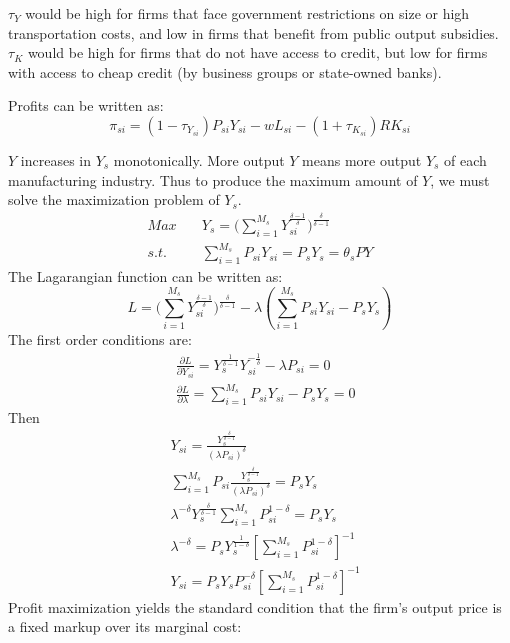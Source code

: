 \documentclass{article}
\begin{document}
$\tau_Y$ would be high for firms that face government restrictions on size or high transportation costs, and low in firms that benefit from public output subsidies. $\tau_K$ would be high for firms that do not have access to credit, but low for firms with access to cheap credit (by business groups or state-owned banks).

Profits can be written as:
\begin{equation*}
    \pi_{si}=(1-\tau_{Y_{si}})P_{si}Y_{si}-wL_{si}-(1+\tau_{K_{si}})RK_{si}
\end{equation*}

$Y$ increases in $Y_s$ monotonically. More output $Y$ means more output $Y_s$ of each manufacturing industry. Thus to produce the maximum amount of $Y$, we must solve the maximization problem of $Y_s$.
\begin{align*}
    Max \quad & Y_s=\biggl(\sum_{i=1}^{M_s}Y_{si}^{\frac{\delta-1}{\delta }}\biggr)^\frac{\delta}{\delta-1}\\
    s.t. \quad & \sum_{i=1}^{M_s} P_{si}Y_{si}=P_sY_s=\theta_sPY
\end{align*}
The Lagarangian function can be written as:
\begin{equation*}
    L=\biggl(\sum_{i=1}^{M_s}Y_{si}^{\frac{\delta-1}{\delta }}\biggr)^\frac{\delta}{\delta-1}-\lambda(\sum_{i=1}^{M_s} P_{si}Y_{si}-P_sY_s)
\end{equation*}
The first order conditions are:
\begin{align*}
    &\frac{\partial L}{\partial Y_{si}}=Y_s^{\frac{1}{\delta-1}}Y_{si}^{-\frac{1}{\delta}}-\lambda P_{si}=0\\
    &\frac{\partial L}{\partial \lambda}=\sum_{i=1}^{M_s} P_{si}Y_{si}-P_sY_s=0
\end{align*}
Then
\begin{align*}
    &Y_{si}=\frac{Y_s^{\frac{\delta}{\delta-1}}}{(\lambda P_{si})^\delta}\\
    &\sum_{i=1}^{M_s} P_{si} \frac{Y_s^{\frac{\delta}{\delta-1}}}{(\lambda P_{si})^\delta}=P_sY_s\\
    &\lambda^{-\delta}Y_s^{\frac{\delta}{\delta-1}}\sum_{i=1}^{M_s} P_{si}^{1-\delta}=P_sY_s\\
    &\lambda^{-\delta}=P_sY_s^{\frac{1}{1-\delta}}[\sum_{i=1}^{M_s} P_{si}^{1-\delta}]^{-1}\\
    &Y_{si}=P_sY_sP_{si}^{-\delta}[\sum_{i=1}^{M_s} P_{si}^{1-\delta}]^{-1}
\end{align*}
Profit maximization yields the standard condition that the firm’s output price is a fixed markup over its marginal cost:
\end{document}

